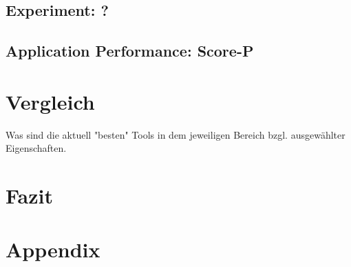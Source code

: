 \documentclass[german,beleg,zihtitle,hyperref,utf8]{zihpub}
\begin{document}
\section{Experiment: ?}

\section{Application Performance: Score-P}


\chapter{Vergleich}
Was sind die aktuell "besten" Tools in dem jeweiligen Bereich bzgl. ausgewählter Eigenschaften.

\chapter{Fazit}



\chapter*{Appendix}
\addtocounter{chapter}{1}
%
\end{document}
